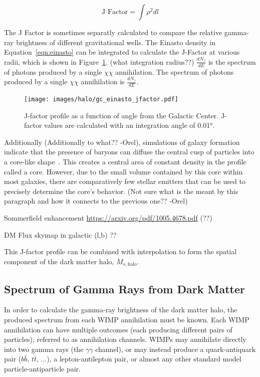     \begin{equation}\label{eqn:jfactor}
      \textrm{J Factor} = \int \rho^2 dl
    \end{equation}

    The J Factor is sometimes separatly calculated to compare the relative gamma-ray brightness of different gravitational wells.
    The Einasto density in Equation~\ref{eqn:einasto} can be integrated to calculate the J-Factor at various radii, which is shown in Figure~\ref{fig:gchalo_jfactor}.
    {\color{red}(what integration radius??)}
    $\frac{dN_{\gamma}}{dE}$ is the spectrum of photons produced by a single $\chi\chi$ annihilation.
    The spectrum of photons produced by a single $\chi\chi$ annihilation is $\frac{dN_{\gamma}}{dE}$.
    
    \begin{figure}[ht]
    \centering
      \texttt{[image: images/halo/gc\_einasto\_jfactor.pdf]}
      \caption[Galactic Center Einasto Halo Jfactor]{
        J-factor profile as a function of angle from the Galactic Center.
        J-factor values are calculated with an integration angle of \ang{0.01}.
      }
      \label{fig:gchalo_jfactor}
    \end{figure}
    
    {\color{red}Additionally (Additionally to what?? -Orel)}, simulations of galaxy formation indicate that the presence of baryons can diffuse the central cusp of particles into a core-like shape~\cite{corecusp_baryondiffuse1,corecusp_baryondiffuse2}.
    This creates a central area of constant density in the profile called a core.
    However, due to the small volume contained by this core within most galaxies, there are comparatively few stellar emitters that can be used to precisely determine the core's behavior.
    {\color{red}(Not sure what is the meant by this paragraph and how it connects to the previous one?? -Orel)}

    {\color{red}Sommerfield enhancement \url{https://arxiv.org/pdf/1005.4678.pdf} (??)}

    
    {\color{red}DM Flux skymap in galactic (l,b) ??}
    
    This J-factor profile can be combined with interpolation to form the spatial component of the dark matter halo, $M_{s,\textrm{halo}}$.
    
  \subsection{Spectrum of Gamma Rays from Dark Matter}\label{dm_spectral}
    In order to calculate the gamma-ray brightness of the dark matter halo, the produced spectrum from each WIMP annihilation must be known.
    Each WIMP annihilation can have multiple outcomes (each producing different pairs of particles), referred to as annihilation channels.
    WIMPs may annihilate directly into two gamma rays (the $\gamma\gamma$ channel), or may instead produce a quark-antiquark pair ($b\bar{b}$, $t\bar{t}$, ...), a lepton-antilepton pair, or almost any other standard model particle-antiparticle pair.

